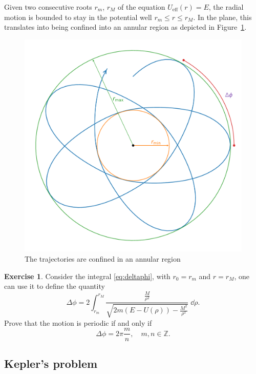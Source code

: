 \documentclass[english,fontsize=11pt,paper=b5]{scrbook}
\theoremstyle{definition}
\newtheorem{exercise}{Exercise}[chapter]
\begin{document}
    Given two consecutive roots $r_m$, $r_M$ of the equation $U_{\mathrm{eff}}(r) = E$, the radial motion is bounded to stay in the potential well $r_m \leq r \leq r_M$.
    In the plane, this translates into being confined into an annular region as depicted in Figure~\ref{fig:annregio}.

    \begin{figure}[ht]
      \centering
      \includegraphics[width=0.75\linewidth]{images/annular-region.pdf}
      \caption{The trajectories are confined in an annular region \cite{book:ll}}
      \label{fig:annregio}
    \end{figure}

    \begin{exercise}
      Consider the integral \eqref{eq:deltaphi}, with $r_0 = r_m$ and $r = r_M$, one can use it to define the quantity
      \begin{equation}\label{eq:Dektaphi}
        \Delta \phi = 2\int_{r_m}^{r_M} \frac{\frac{M}{\rho^2}}{\sqrt{2m(E-U(\rho)) - \frac{M^2}{\rho^2}}}\;\dd \rho.
      \end{equation}
      Prove that the motion is periodic if and only if
      \begin{equation}
        \Delta \phi = 2\pi \frac mn, \quad m,n\in\mathbb{Z}.
      \end{equation}
    \end{exercise}

    \subsection{Kepler's problem}
\end{document}
